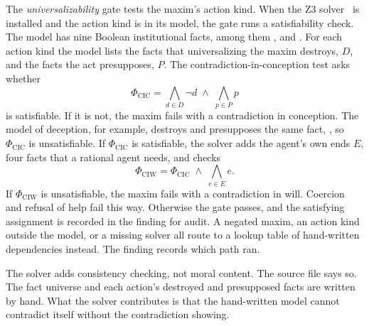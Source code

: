 The \emph{universalizability} gate tests the maxim's action kind. When the Z3 solver~\cite{demoura2008z3}
is installed and the action kind is in its model, the gate runs a satisfiability check. The model
has nine Boolean institutional facts, among them ,
 and . For each action kind
the model lists the facts that universalizing the maxim destroys, $D$, and the facts the act
presupposes, $P$. The contradiction-in-conception test asks whether
\begin{equation}
\Phi_{\mathrm{CIC}} = \bigwedge_{d \in D} \neg d \;\wedge\; \bigwedge_{p \in P} p
\label{eq:compiler-cic}
\end{equation}
is satisfiable. If it is not, the maxim fails with a contradiction in conception. The model of
deception, for example, destroys and presupposes the same fact, , so
$\Phi_{\mathrm{CIC}}$ is unsatisfiable. If $\Phi_{\mathrm{CIC}}$ is satisfiable, the solver adds
the agent's own ends $E$, four facts that a rational agent needs, and checks
\begin{equation}
\Phi_{\mathrm{CIW}} = \Phi_{\mathrm{CIC}} \;\wedge\; \bigwedge_{e \in E} e .
\label{eq:compiler-ciw}
\end{equation}
If $\Phi_{\mathrm{CIW}}$ is unsatisfiable, the maxim fails with a contradiction in will. Coercion
and refusal of help fail this way. Otherwise the gate passes, and the satisfying assignment is
recorded in the finding for audit. A negated maxim, an action kind outside the model, or a missing
solver all route to a lookup table of hand-written dependencies instead. The finding records which
path ran.

The solver adds consistency checking, not moral content. The source file says so. The fact
universe and each action's destroyed and presupposed facts are written by hand. What the solver
contributes is that the hand-written model cannot contradict itself without the contradiction
showing.

